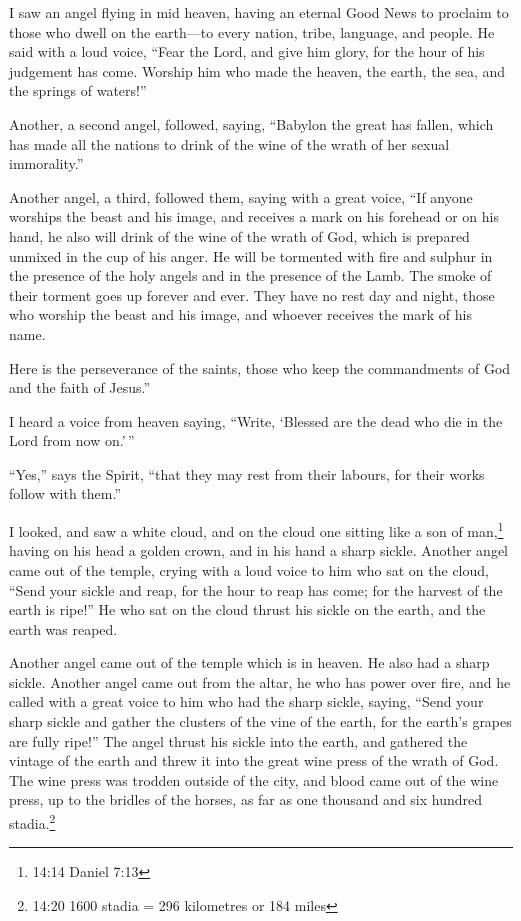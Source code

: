  I saw an angel flying in mid heaven, having an eternal Good
News to proclaim to those who dwell on the earth---to every nation,
tribe, language, and people.  He said with a loud voice,
``Fear the Lord, and give him glory, for the hour of his judgement has
come. Worship him who made the heaven, the earth, the sea, and the
springs of waters!''

 Another, a second angel, followed, saying, ``Babylon the
great has fallen, which has made all the nations to drink of the wine of
the wrath of her sexual immorality.''

 Another angel, a third, followed them, saying with a great
voice, ``If anyone worships the beast and his image, and receives a mark
on his forehead or on his hand,  he also will drink of the
wine of the wrath of God, which is prepared unmixed in the cup of his
anger. He will be tormented with fire and sulphur in the presence of the
holy angels and in the presence of the Lamb.  The smoke of
their torment goes up forever and ever. They have no rest day and night,
those who worship the beast and his image, and whoever receives the mark
of his name.

 Here is the perseverance of the saints, those who keep the
commandments of God and the faith of Jesus.''

 I heard a voice from heaven saying, ``Write, `Blessed are
the dead who die in the Lord from now on.'\,''

``Yes,'' says the Spirit, ``that they may rest from their labours, for
their works follow with them.''

 I looked, and saw a white cloud, and on the cloud one
sitting like a son of man,\footnote{14:14 Daniel 7:13} having on his
head a golden crown, and in his hand a sharp sickle. 
Another angel came out of the temple, crying with a loud voice to him
who sat on the cloud, ``Send your sickle and reap, for the hour to reap
has come; for the harvest of the earth is ripe!''  He who
sat on the cloud thrust his sickle on the earth, and the earth was
reaped.

 Another angel came out of the temple which is in heaven.
He also had a sharp sickle.  Another angel came out from
the altar, he who has power over fire, and he called with a great voice
to him who had the sharp sickle, saying, ``Send your sharp sickle and
gather the clusters of the vine of the earth, for the earth's grapes are
fully ripe!''  The angel thrust his sickle into the earth,
and gathered the vintage of the earth and threw it into the great wine
press of the wrath of God.  The wine press was trodden
outside of the city, and blood came out of the wine press, up to the
bridles of the horses, as far as one thousand and six hundred
stadia.\footnote{14:20 1600 stadia = 296 kilometres or 184 miles}

